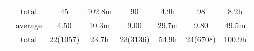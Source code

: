 \begin{table*}
\begin{tabular}{lccccccc}
		\midrule
		&  \cellcolor{gray!25}total  &  \cellcolor{gray!25}45 &  \cellcolor{gray!25}102.8m  &  \cellcolor{gray!25}90  &  \cellcolor{gray!25}4.9h  &  \cellcolor{gray!25}98  &  \cellcolor{gray!25}8.2h\\
		&  average  &  4.50 &  10.3m  &  9.00  &  29.7m  &  9.80  &  49.5m\\
		\midrule
		\midrule
		&  \cellcolor{gray!25}total  &  \cellcolor{gray!25}22(1057) &  \cellcolor{gray!25}23.7h  &  \cellcolor{gray!25}23(3136)  &  \cellcolor{gray!25}54.9h  &  \cellcolor{gray!25}24(6708)  &  \cellcolor{gray!25}100.9h\\
		\bottomrule
\end{tabular}
\end{table*}